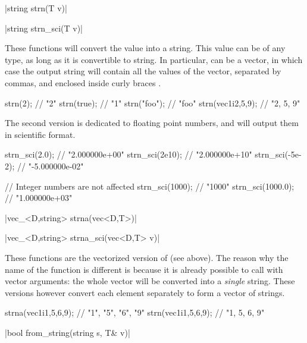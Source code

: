 \funcitem \cppinline|string strn(T v)| 

\cppinline|string strn_sci(T v)| 

These functions will convert the value  into a string. This value can be of any type, as long as it is convertible to string. In particular,  can be a vector, in which case the output string will contain all the values of the vector, separated by commas, and enclosed inside curly braces .

\begin{example}
\begin{cppcode}
strn(2);            // "2"
strn(true);         // "1"
strn("foo");        // "foo"
strn(vec1i{2,5,9}); // "{2, 5, 9}"
\end{cppcode}
\end{example}

The second version is dedicated to floating point numbers, and will output them in scientific format.

\begin{example}
\begin{cppcode}
strn_sci(2.0);    // "2.000000e+00"
strn_sci(2e10);   // "2.000000e+10"
strn_sci(-5e-2);  // "-5.000000e-02"

// Integer numbers are not affected
strn_sci(1000);   // "1000"
strn_sci(1000.0); // "1.000000e+03"
\end{cppcode}
\end{example}

\funcitem \cppinline|vec_<D,string> strna(vec<D,T>)| 

\cppinline|vec_<D,string> strna_sci(vec<D,T> v)| 

These functions are the vectorized version of  (see above). The reason why the name of the function is different is because it is already possible to call  with vector arguments: the whole vector will be converted into a \emph{single} string. These versions however convert each element separately to form a vector of strings.

\begin{example}
\begin{cppcode}
strna(vec1i{1,5,6,9}); // {"1", "5", "6", "9"}
strn(vec1i{1,5,6,9});  // "{1, 5, 6, 9}"
\end{cppcode}
\end{example}

\funcitem \vectorfunc \cppinline|bool from_string(string s, T& v)| 

